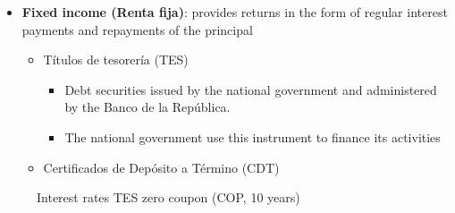 \documentclass[
  ignorenonframetext,
]{beamer}
\begin{document}
\begin{frame}{}
\label{section-11}
\begin{itemize}
\item
  \textbf{Fixed income (Renta fija)}: provides returns in the form of
  regular interest payments and repayments of the principal

  \begin{itemize}
  \item
    Títulos de tesorería (TES)

    \begin{itemize}
    \item
      Debt securities issued by the national government and administered
      by the Banco de la República.
    \item
      The national government use this instrument to finance its
      activities
    \end{itemize}
  \item
    Certificados de Depósito a Término (CDT)
  \end{itemize}
\end{itemize}
\end{frame}

\begin{frame}{}
\label{section-12}
\begin{figure}


\caption{\label{fig-cero-cupon-tes-10-anos-col}Interest rates TES zero
coupon (COP, 10 years)}

\end{figure}%
\end{frame}
\end{document}
